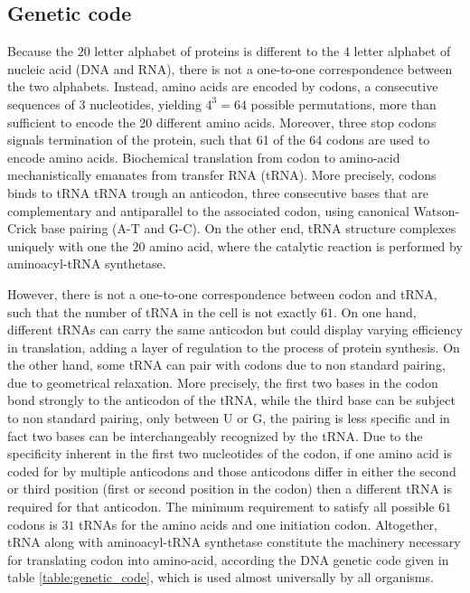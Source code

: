 \subsection{Genetic code}

Because the $20$ letter alphabet of proteins is different to the $4$ letter alphabet of nucleic acid (DNA and RNA), there is not a one-to-one correspondence between the two alphabets.
Instead, amino acids are encoded by codons, a consecutive sequences of 3 nucleotides, yielding $4^3=64$ possible permutations, more than sufficient to encode the 20 different amino acids.
Moreover, three stop codons signals termination of the protein, such that 61 of the 64 codons are used to encode amino acids.
Biochemical translation from \gls{codon} to amino-acid mechanistically emanates from transfer \acrshort{RNA} (\acrshort{tRNA}).
More precisely, codons binds to \acrshort{tRNA} \acrshort{tRNA} trough an anticodon, three consecutive bases that are complementary and antiparallel to the associated \gls{codon}, using canonical Watson-Crick base pairing (A-T and G-C).
On the other end, \acrshort{tRNA} structure complexes uniquely with one the $20$ amino acid, where the catalytic reaction is performed by aminoacyl-tRNA synthetase.

However, there is not a one-to-one correspondence between codon and \acrshort{tRNA}, such that the number of tRNA in the cell is not exactly $61$.
On one hand, different tRNAs can carry the same anticodon but could display varying efficiency in translation, adding a layer of regulation to the process of protein synthesis.
On the other hand, some tRNA can pair with codons due to non standard pairing, due to geometrical relaxation.
More precisely, the first two bases in the codon bond strongly to the anticodon of the tRNA, while the third base can be subject to non standard pairing, only between U or G, the pairing is less specific and in fact two bases can be interchangeably recognized by the tRNA.
Due to the specificity inherent in the first two nucleotides of the codon, if one amino acid is coded for by multiple anticodons and those anticodons differ in either the second or third position (first or second position in the codon) then a different tRNA is required for that anticodon.
The minimum requirement to satisfy all possible $61$ codons is $31$ tRNAs for the amino acids and one initiation codon.
Altogether, \acrshort{tRNA} along with aminoacyl-tRNA synthetase constitute the machinery necessary for translating \gls{codon} into amino-acid, according the DNA genetic code given in table \ref{table:genetic_code}, which is used almost universally by all organisms.


